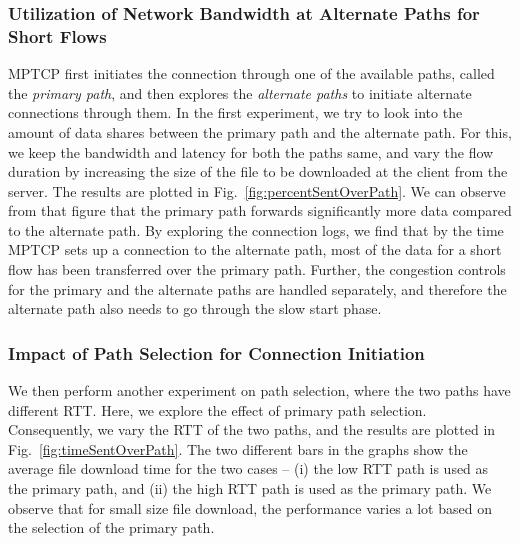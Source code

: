 \subsubsection{Utilization of Network Bandwidth at Alternate Paths for Short Flows}
MPTCP first initiates the connection through one of the available paths, called the {\em primary path}, and then explores the {\em alternate paths} to initiate alternate connections through them. In the first experiment, we try to look into the amount of data shares between the primary path and the alternate path. For this, we keep the bandwidth and latency for both the paths same, and vary the flow duration by increasing the size of the file to be downloaded at the client from the server. The results are plotted in Fig.~\ref{fig:percentSentOverPath}. We can observe from that figure that 
the primary path forwards significantly more data compared to the alternate path. By exploring the connection logs, we find that by the time MPTCP sets up a connection to the alternate path, most of the data for a short flow has been transferred over the primary path. Further, the congestion controls for the primary and the alternate paths are handled separately, and therefore the alternate path also needs to go through the slow start phase. 

\subsubsection{Impact of Path Selection for Connection Initiation}
We then perform another experiment on path selection, where the two paths have different RTT. Here, we explore the effect of primary path selection. 
Consequently, we vary the RTT of the two paths, and the results are plotted in Fig.~\ref{fig:timeSentOverPath}. The two different bars in the graphs show the average file download time for the two cases -- (i) the low RTT path is used as the primary path, and (ii) the high RTT path is used as the primary path. We observe that for small size file download, the performance varies a lot based on the selection of the primary path. 

